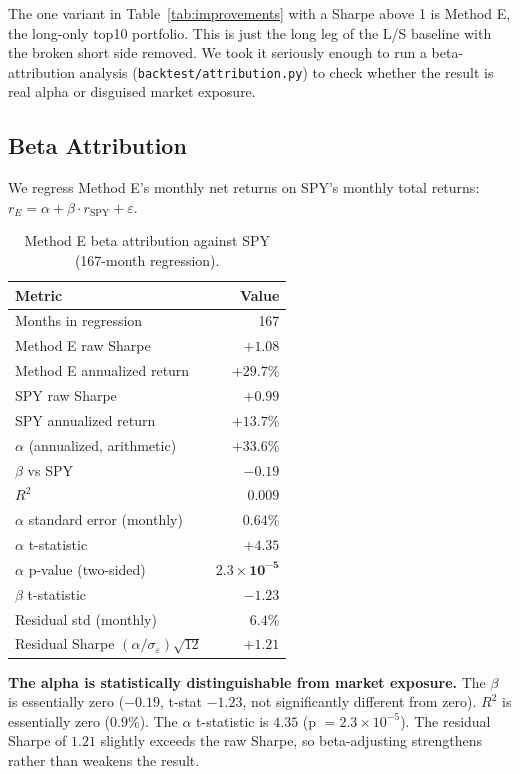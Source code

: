 \documentclass[11pt,a4paper]{article}
\begin{document}
The one variant in Table~\ref{tab:improvements} with a Sharpe above 1 is Method E, the long-only top10 portfolio. This is just the long leg of the L/S baseline with the broken short side removed. We took it seriously enough to run a beta-attribution analysis (\texttt{backtest/attribution.py}) to check whether the result is real alpha or disguised market exposure.

\subsection{Beta Attribution}

We regress Method E's monthly net returns on SPY's monthly total returns: $r_E = \alpha + \beta \cdot r_\text{SPY} + \varepsilon$.

\begin{table}[H]
\centering
\caption{Method E beta attribution against SPY (167-month regression).}
\label{tab:attribution}
\begin{tabular}{lr}
\toprule
Metric & Value \\
\midrule
Months in regression & 167 \\
Method E raw Sharpe & $+1.08$ \\
Method E annualized return & $+29.7\%$ \\
SPY raw Sharpe & $+0.99$ \\
SPY annualized return & $+13.7\%$ \\
\midrule
$\alpha$ (annualized, arithmetic) & $\mathbf{+33.6\%}$ \\
$\beta$ vs SPY & $\mathbf{-0.19}$ \\
$R^2$ & $0.009$ \\
$\alpha$ standard error (monthly) & $0.64\%$ \\
$\alpha$ t-statistic & $\mathbf{+4.35}$ \\
$\alpha$ p-value (two-sided) & $\mathbf{2.3 \times 10^{-5}}$ \\
$\beta$ t-statistic & $-1.23$ \\
\midrule
Residual std (monthly) & $6.4\%$ \\
Residual Sharpe $(\alpha/\sigma_\varepsilon)\sqrt{12}$ & $\mathbf{+1.21}$ \\
\bottomrule
\end{tabular}
\end{table}

\textbf{The alpha is statistically distinguishable from market exposure.} The $\beta$ is essentially zero ($-0.19$, t-stat $-1.23$, not significantly different from zero). $R^2$ is essentially zero ($0.9\%$). The $\alpha$ t-statistic is $4.35$ (p $= 2.3 \times 10^{-5}$). The residual Sharpe of $1.21$ slightly exceeds the raw Sharpe, so beta-adjusting strengthens rather than weakens the result.
\end{document}
